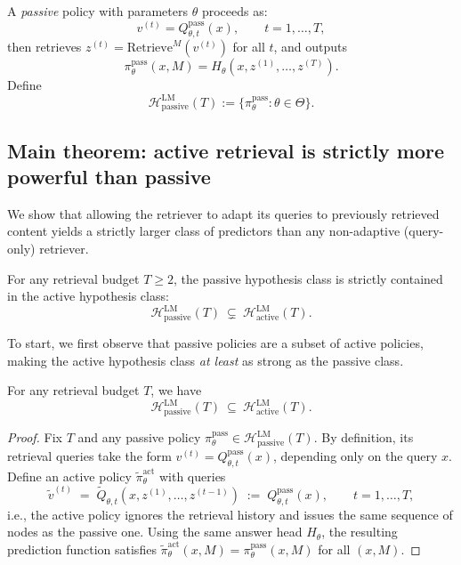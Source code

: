 \documentclass{llmxive}
\begin{document}
\begin{definition}
A \emph{passive} policy with parameters \(\theta\) proceeds as:
\[
  v^{(t)} = Q^{\mathrm{pass}}_{\theta,t}(x), \qquad t=1,\dots,T,
\]
then retrieves \(z^{(t)} = \mathrm{Retrieve}^M(v^{(t)})\) for all \(t\), and outputs
\[
  \pi^{\mathrm{pass}}_\theta(x,M) = H_\theta(x, z^{(1)},\dots,z^{(T)}).
\]
Define
\[
  \mathcal{H}^{\mathrm{LM}}_{\mathrm{passive}}(T) := \{\pi^{\mathrm{pass}}_\theta : \theta\in\Theta\}.
\]
\end{definition}



\subsection{Main theorem: active retrieval is strictly more powerful than passive}

We show that allowing the retriever to adapt its queries to previously retrieved
content yields a strictly larger class of predictors than any non-adaptive (query-only) retriever.

\begin{theorem} For any retrieval budget \(T\ge 2\), the passive hypothesis class is strictly contained in the active hypothesis class: \[
\mathcal{H}^{\mathrm{LM}}_{\mathrm{passive}}(T)\ \subsetneq\ \mathcal{H}^{\mathrm{LM}}_{\mathrm{active}}(T). \] 
\label{thm:main}
\end{theorem}


To start, we first observe that passive policies are a subset of active policies, making the active hypothesis class \emph{at least} as strong as the passive class. 

\begin{lemma} \label{lem:power} For any retrieval budget \(T\), we have \[ \mathcal{H}^{\mathrm{LM}}_{\mathrm{passive}}(T)\ \subseteq\ \mathcal{H}^{\mathrm{LM}}_{\mathrm{active}}(T). \] \end{lemma} \begin{proof} Fix \(T\) and any passive policy \(\pi^{\mathrm{pass}}_\theta \in \mathcal{H}^{\mathrm{LM}}_{\mathrm{passive}}(T)\). By definition, its retrieval queries take the form \(v^{(t)} = Q^{\mathrm{pass}}_{\theta,t}(x)\), depending only on the query \(x\). Define an active policy \(\tilde \pi^{\mathrm{act}}_\theta\) with queries \[ \tilde v^{(t)} \;=\; \tilde Q_{\theta,t}(x,z^{(1)},\dots,z^{(t-1)}) \;:=\; Q^{\mathrm{pass}}_{\theta,t}(x), \qquad t=1,\dots,T, \] i.e., the active policy ignores the retrieval history and issues the same sequence of nodes as the passive one. Using the same answer head \(H_\theta\), the resulting prediction function satisfies \(\tilde \pi^{\mathrm{act}}_\theta(x,M)=\pi^{\mathrm{pass}}_\theta(x,M)\) for all \((x,M)\). 
\end{proof} 
\end{document}
